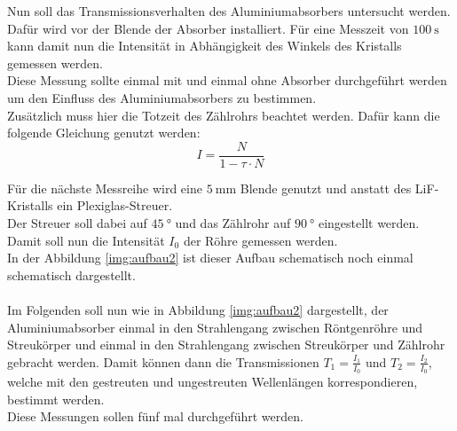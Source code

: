 \noindent
Nun soll das Transmissionsverhalten des Aluminiumabsorbers untersucht werden. Dafür wird vor der Blende der Absorber installiert.
Für eine Messzeit von $\SI{100}{\second}$ kann damit nun die Intensität in Abhängigkeit des Winkels des Kristalls gemessen werden.\\
Diese Messung sollte einmal mit und einmal ohne Absorber durchgeführt werden um den Einfluss des Aluminiumabsorbers zu bestimmen.\\
Zusätzlich muss hier die Totzeit des Zählrohrs beachtet werden. Dafür kann die folgende Gleichung genutzt werden:
\begin{equation*}
    I = \dfrac{N}{1-\tau \cdot N}
\end{equation*}


\noindent
Für die nächste Messreihe wird eine $\SI{5}{\milli\metre}$ Blende genutzt und anstatt des LiF-Kristalls ein Plexiglas-Streuer.\\
Der Streuer soll dabei auf $\SI{45}{\degree}$ und das Zählrohr auf $\SI{90}{\degree}$ eingestellt werden.
Damit soll nun die Intensität $I_0$ der Röhre gemessen werden.\\
In der Abbildung \ref{img:aufbau2} ist dieser Aufbau schematisch noch einmal schematisch dargestellt.\\\\

\noindent
Im Folgenden soll nun wie in Abbildung \ref{img:aufbau2} dargestellt, der Aluminiumabsorber einmal in 
den Strahlengang zwischen Röntgenröhre und Streukörper und einmal in den Strahlengang
zwischen Streukörper und Zählrohr gebracht werden.
Damit können dann die Transmissionen $T_1=\frac{I_1}{I_0}$ und $T_2=\frac{I_2}{I_0}$, welche mit den gestreuten und ungestreuten Wellenlängen korrespondieren, bestimmt werden.\\
Diese Messungen sollen fünf mal durchgeführt werden.

